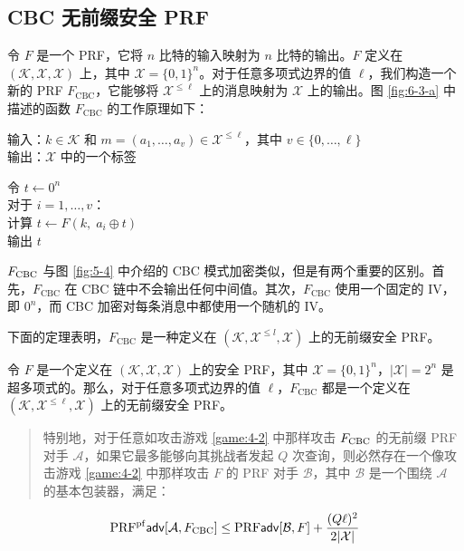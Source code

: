 \subsection{CBC 无前缀安全 PRF}\label{subsec:6-4-1}

令 $F$ 是一个 PRF，它将 $n$ 比特的输入映射为 $n$ 比特的输出。$F$ 定义在 $(\mathcal{K},\mathcal{X},\mathcal{X})$ 上，其中 $\mathcal{X}=\{0,1\}^n$。对于任意多项式边界的值 $\ell$，我们构造一个新的 PRF $F_\mathrm{CBC}$，它能够将 $\mathcal{X}^{\leq\ell}$ 上的消息映射为 $\mathcal{X}$ 上的输出。图 \ref{fig:6-3-a} 中描述的函数 $F_\mathrm{CBC}$ 的工作原理如下：

\vspace*{5pt}

\hspace*{5pt} 输入：$k\in\mathcal{K}$ 和 $m=(a_1,\dots,a_v)\in\mathcal{X}^{\leq\ell}$，其中 $v\in\{0,\dots,\ell\}$\\
\hspace*{26pt} 输出：$\mathcal{X}$ 中的一个标签

\vspace*{5pt}

\hspace*{5pt} 令 $t\leftarrow0^n$\\
\hspace*{26pt} 对于 $i=1,\dots,v$：\\
\hspace*{50pt} 计算 $t\leftarrow F(k,\;a_i\oplus t)$\\
\hspace*{26pt} 输出 $t$

\vspace*{5pt}

\noindent
$F_{\rm CBC}$ 与图 \ref{fig:5-4}	中介绍的 CBC 模式加密类似，但是有两个重要的区别。首先，$F_\mathrm{CBC}$ 在 CBC 链中不会输出任何中间值。其次，$F_\mathrm{CBC}$ 使用一个固定的 IV，即 $0^n$，而 CBC 加密对每条消息中都使用一个随机的 IV。

下面的定理表明，$F_\mathrm{CBC}$ 是一种定义在 $(\mathcal{K},\mathcal{X}^{\leq l},\mathcal{X})$ 上的无前缀安全 PRF。

\begin{theorem}\label{theo:6-3}
令 $F$ 是一个定义在 $(\mathcal{K},\mathcal{X},\mathcal{X})$ 上的安全 PRF，其中 $\mathcal{X}=\{0,1\}^n$，$|\mathcal{X}|=2^n$ 是超多项式的。那么，对于任意多项式边界的值 $\ell$，$F_\mathrm{CBC}$ 都是一个定义在 $(\mathcal{K},\mathcal{X}^{\leq\ell},\mathcal{X})$ 上的无前缀安全 PRF。
\begin{quote}
特别地，对于任意如攻击游戏 \ref{game:4-2} 中那样攻击 $F_{\rm CBC}$ 的无前缀 PRF 对手 $\mathcal{A}$，如果它最多能够向其挑战者发起 $Q$ 次查询，则必然存在一个像攻击游戏 \ref{game:4-2} 中那样攻击 $F$ 的 PRF 对手 $\mathcal{B}$，其中 $\mathcal{B}$ 是一个围绕 $\mathcal{A}$ 的基本包装器，满足：
\end{quote}
\begin{equation}\label{eq:6-7}
{\rm PRF^{pf}\mathsf{adv}}[\mathcal{A},F_{\rm CBC}]\leq{\rm PRF\mathsf{adv}}[\mathcal{B},F]+\frac{(Q\ell)^2}{2|\mathcal{X}|}
\end{equation}
\end{theorem}


